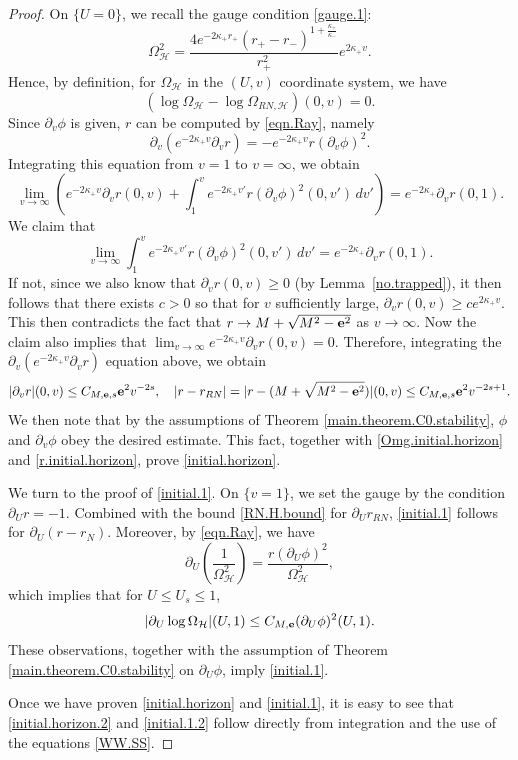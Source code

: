 \documentclass[10pt, reqno]{amsart}
\theoremstyle{definition}
\theoremstyle{remark}
\numberwithin{equation}{section}
\newcommand{\ud}{d}
\newcommand{\rd}{\partial}
\newcommand{\0}{\emptyset}
\newcommand{\Omg}{\Omega}
\newcommand{\f}{\frac}
\begin{document}
\begin{proof}
On $\{U=0\}$, we recall the gauge condition \eqref{gauge.1}:
$$\Omg_{\mathcal H}^2=\f{4e^{-2\kappa_+ r_+}(r_+-r_-)^{1+\f{\kappa_+}{\kappa_-}}}{r_+^2}e^{2\kappa_+ v}.$$
Hence, by definition, for $\Omg_{\mathcal H}$ in the $(U,v)$ coordinate system, we have 
\begin{equation}\label{Omg.initial.horizon}
\left(\log\Omg_{\mathcal H}-\log\Omg_{RN,\mathcal H}\right)(0,v)=0.
\end{equation}
Since $\rd_v\phi$ is given, $r$ can be computed by \eqref{eqn.Ray}, namely
$$\rd_v(e^{-2\kappa_+ v}\rd_v r)=-e^{-2\kappa_+ v}r(\rd_v\phi)^2.$$
Integrating this equation from $v=1$ to $v=\infty$, we obtain
$$\lim_{v\to \infty} (e^{-2\kappa_+ v}\rd_v r(0,v) + \int_1^v e^{-2\kappa_+ v'}r(\rd_v\phi)^2(0,v')\, \ud v') = e^{-2\kappa_+}\rd_v r(0,1).$$
We claim that 
$$\lim_{v\to \infty} \int_1^v e^{-2\kappa_+ v'}r(\rd_v\phi)^2(0,v')\, \ud v' = e^{-2\kappa_+}\rd_v r(0,1).$$
If not, since we also know that $\rd_v r(0,v)\geq 0$ (by Lemma~\ref{no.trapped}), it then follows that there exists $c>0$ so that for $v$ sufficiently large, $\rd_v r(0,v) \geq ce^{2\kappa_+ v}$. This then contradicts the fact that $r\to M+\sqrt{M^2-{\bf e}^2}$ as $v\to \infty$. Now the claim also implies that $\lim_{v\to \infty} e^{-2\kappa_+ v}\rd_v r(0,v) = 0$. Therefore, integrating the $\rd_v(e^{-2\kappa_+ v}\rd_v r)$ equation above, we obtain
\begin{equation}\label{r.initial.horizon}
|\rd_v r|(0,v)\leq C_{M,{\bf e},s} {\bf e}^2 v^{-2s},\quad |r-r_{RN}|=|r-(M+\sqrt{M^2-{\bf e}^2})|(0,v)\leq C_{M,{\bf e},s} {\bf e}^2 v^{-2s+1}.
\end{equation}
We then note that by the assumptions of Theorem \ref{main.theorem.C0.stability}, $\phi$ and $\rd_v\phi$ obey the desired estimate. This fact, together with \eqref{Omg.initial.horizon} and \eqref{r.initial.horizon}, prove \eqref{initial.horizon}.

We turn to the proof of \eqref{initial.1}.
On $\{v=1\}$, we set the gauge by the condition 
$\rd_U r=-1.$
Combined with the bound \eqref{RN.H.bound} for $\rd_{U} r_{RN}$, \eqref{initial.1} follows for $\rd_{U} (r - r_{N})$.
Moreover, by \eqref{eqn.Ray}, we have
$$\rd_U \left( \f{1}{\Omg^2_{\mathcal H}} \right)=\f{r(\rd_U\phi)^2}{\Omg_{\mathcal H}^2},$$
which implies that for $U\leq U_s\leq 1$,
$$|\rd_U\log\Omg_{\mathcal H}|(U,1)\leq C_{M,{\bf e}} (\rd_{U} \phi)^2(U, 1).$$
These observations, together with the assumption of Theorem \ref{main.theorem.C0.stability} on $\rd_U\phi$, imply \eqref{initial.1}.

Once we have proven \eqref{initial.horizon} and \eqref{initial.1}, it is easy to see that \eqref{initial.horizon.2} and \eqref{initial.1.2} follow directly from integration and the use of the equations \eqref{WW.SS}.
\end{proof}
\end{document}
